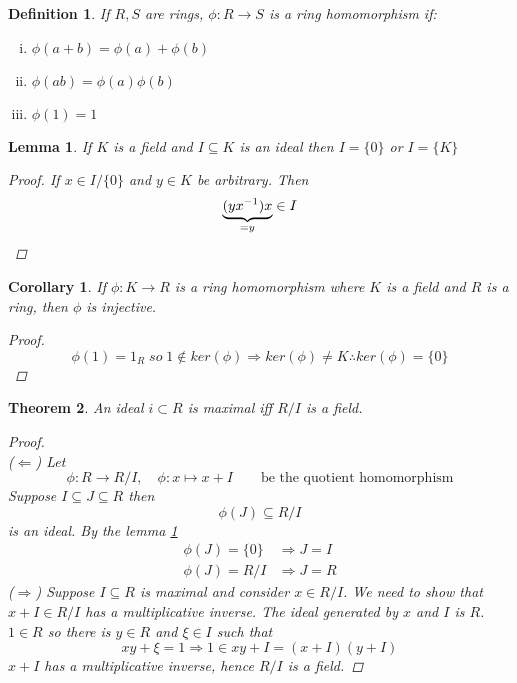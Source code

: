 \documentclass[12pt]{article}
\newtheorem{theorem}{Theorem}[section]
\newtheorem{lemma}[theorem]{Lemma}
\newtheorem{definition}{Definition}[section]
\newtheorem{corollary}{Corollary}[section]
\begin{document}
\begin{definition}
If $R,S$ are rings, $\phi:R \rightarrow S$ is a ring homomorphism if:
\begin{enumerate}[(i)]
\item $\phi (a+b) = \phi (a) + \phi (b)$
\item $\phi (ab) = \phi (a) \phi (b)$
\item $\phi (1) = 1$
\end{enumerate}
\end{definition}

\begin{lemma}\label{field ideal}
If $K$ is a field and $I \subseteq K$ is an ideal then $I = \{ 0 \}$ or $I=\{ K\}$
\begin{proof}
If $x \in I/ \{0\}$ and $y \in K$ be arbitrary. Then 
\[\underbrace{(y x^{-1})x}_{\mathclap{= y}} \in I\]
\end{proof}
\end{lemma}

\begin{corollary}
If $\phi:K \rightarrow R$ is a ring homomorphism where $K$ is a field and $R$ is a ring, then $\phi$ is injective.
\begin{proof}
\[\phi(1) = 1_{R} \; so \; 1 \notin ker(\phi ) \Rightarrow ker(\phi ) \neq K  \therefore ker(\phi) = \{0 \}\]
\end{proof}
\end{corollary}

\begin{theorem}
An ideal $i \subset R$ is maximal iff $R/I$ is a field.
\begin{proof} \quad \\
($\Leftarrow $) 
Let 
\[\phi :R \rightarrow R/I, \quad \phi: x \mapsto x +I \qquad\text{be the quotient homomorphism}\]
Suppose $I \subseteq J \subseteq R$ then
\[ \phi (J) \subseteq R/I \]
is an ideal. By the lemma \ref{field ideal}
\begin{align*}
\phi (J) = \{0 \} &\Rightarrow J= I\\
\phi (J) = R/I  &\Rightarrow J= R 
\end{align*}
($\Rightarrow $)
Suppose $I \subseteq R$ is maximal and consider $x \in R/I$. We need to show that $x+I \in R/I$ has a multiplicative inverse. The ideal generated by $x$ and $I$  is $R$. $1 \in R$ so there is $y \in R$ and $\xi \in I$ such that
\[xy + \xi = 1 \Rightarrow 1 \in xy+I = (x+I)(y+I)\]
$x+I$ has a multiplicative inverse, hence $R/I$ is a field. 
\end{proof}
\end{theorem} 
\end{document}
